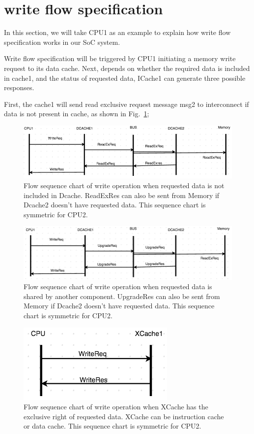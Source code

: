 \documentclass[conference]{IEEEtran}
\begin{document}
\section{write flow specification}

In this section, we will take CPU1 as an example to explain how write flow specification works in our SoC system.
 

Write flow specification will be triggered by CPU1 initiating a memory write request to its data cache. Next, depends on whether the required data is included in cache1, and the status of requested data,  ICache1 can generate three possible responses. 

First, the cache1 will send read exclusive request message msg2 to interconnect if data is not present in cache, as shown in Fig.~\ref{write3}; 

 \begin{figure} 
 \centerline{
 \includegraphics[width=3.9In]{figures/write3.png}}
 \caption{Flow sequence chart of write operation when requested data is not included in Dcache. ReadExRes can also be sent from Memory if Dcache2 doesn't have requested data. This sequence chart is symmetric for CPU2. }
 \label{write3}
 \end{figure}
 
 \begin{figure} 
 \centerline{
 \includegraphics[width=3.9In]{figures/write2.png}}
 \caption{Flow sequence chart of write operation when requested data is shared by another component. UpgradeRes can also be sent from Memory if Dcache2 doesn't have requested data. This sequence chart is symmetric for CPU2. }
 \label{write2}
 \end{figure}

 \begin{figure} 
 \includegraphics[width=2In]{figures/write1.png}
 \caption{Flow sequence chart of write operation when XCache has the exclusive right of requested data. XCache can be instruction cache or data cache. This sequence chart is symmetric for CPU2. }
 \label{write1}
 \end{figure}
 
\end{document}
